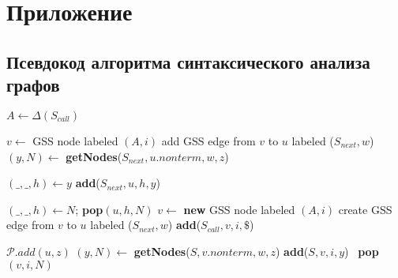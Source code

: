 \appendix

\section*{Приложение}
\label{appendix}
\subsection*{Псевдокод алгоритма синтаксического анализа графов}

\begin{algorithmic}
	\State $A \gets \Delta(S_{call})$

		\State $v \gets$ GSS node labeled $(A, i)$
			\State add GSS edge from $v$ to $u$ labeled ($S_{next},w$)
				\State $(y,N) \gets$ \textbf{getNodes}($S_{next}, u.nonterm, w, z$)

				\State $(\_, \_, h) \gets y$
				\State \textbf{add}($S_{next} , u, h, y$)

					\State $(\_, \_, h) \gets N$;
					\textbf{pop}$(u,h,N)$ 
				\EndIf
			\EndFor
		\EndIf
	\Else
		\State $v \gets$ \textbf{new} GSS node labeled $(A, i)$
		\State create GSS edge from $v$ to $u$ labeled ($S_{next}, w$)
		\State \textbf{add}($S_{call}, v, i, \$ $)
	\EndIf
\EndFunction
\end{algorithmic}

\begin{algorithmic}   
		\State $\mathcal{P}.add(u,z)$
			\State $(y,N) \gets$ \textbf{getNodes}($S, v.nonterm, w, z$)
			\State \textbf{add}($S,v,i,y$)
				\ \textbf{pop}$(v,i,N)$ 
			\EndIf
		\EndFor
	\EndIf
\EndFunction
\end{algorithmic}

